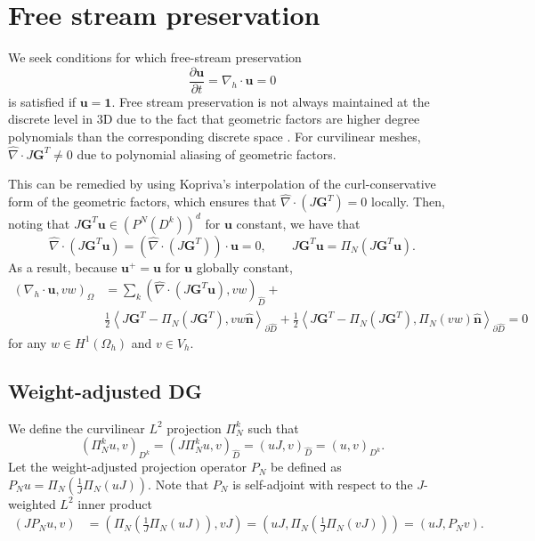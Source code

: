 \documentclass[preprint,10pt]{article}
\theoremstyle{definition}
\theoremstyle{lemma}
\theoremstyle{theorem}
\theoremstyle{assumption}
\renewcommand{\hat}{\widehat}
\newcommand{\pd}[2]{\frac{\partial#1}{\partial#2}}
\newcommand{\LRp}[1]{\left( #1 \right)}
\newcommand{\LRa}[1]{\left\langle #1 \right\rangle}
\newcommand{\Grad} {\ensuremath{\nabla}}
\renewcommand{\d}{\partial}
\begin{document}
\section{Free stream preservation}

We seek conditions for which free-stream preservation 
\[
\pd{\bm{u}}{t} = \Grad_h \cdot \bm{u} = 0
\]
is satisfied if $\bm{u} = \bm{1}$.  Free stream preservation is not always maintained at the discrete level in 3D due to the fact that geometric factors are higher degree polynomials than the corresponding discrete space \cite{kopriva2006metric, johnen2013geometrical}.  For curvilinear meshes, $\hat{\Grad}\cdot{J\bm{G}^T} \neq 0$ due to polynomial aliasing of geometric factors.  

This can be remedied by using Kopriva's interpolation of the curl-conservative form of the geometric factors, which ensures that $\hat{\Grad}\cdot\LRp{J\bm{G}^T} = 0$ locally.   Then, noting that $J\bm{G}^T\bm{u} \in \LRp{P^N\LRp{D^k}}^d$ for $\bm{u}$ constant, we have that
\[
\hat{\Grad}\cdot \LRp{J\bm{G}^T\bm{u}} = \LRp{\hat{\Grad}\cdot \LRp{J\bm{G}^T}}\cdot\bm{u} = 0, \qquad J\bm{G}^T\bm{u} = \Pi_N\LRp{J\bm{G}^T\bm{u}}.
\]
As a result, because $\bm{u}^+ = \bm{u}$ for $\bm{u}$ globally constant,
\begin{align*}
\LRp{\Grad_h \cdot \bm{u},vw}_{\Omega} &= \sum_k \LRp{\hat{\Grad} \cdot \LRp{J\bm{G}^T\bm{u}},vw }_{\hat{D}} + \\
&\frac{1}{2}\LRa{J\bm{G}^T - \Pi_N \LRp{J\bm{G}^T}, vw \hat{\bm{n}}}_{\d \hat{D}} + \frac{1}{2}\LRa{J\bm{G}^T - \Pi_N \LRp{J\bm{G}^T}, \Pi_N\LRp{vw}\hat{\bm{n}}}_{\d \hat{D}} = 0
\end{align*}
for any $w \in H^1\LRp{\Omega_h}$ and $v\in V_h$.  





\subsection{Weight-adjusted DG}


We define the curvilinear $L^2$ projection $\Pi_N^k$ such that
\[
\LRp{\Pi_N^k u,v}_{D^k} = \LRp{J \Pi_N^k u,v}_{\hat{D}} = \LRp{uJ,v}_{\hat{D}} = \LRp{u,v}_{D^k}.  
\]
Let the weight-adjusted projection operator $P_N$ be defined as $P_N u = \Pi_N\LRp{\frac{1}{J}\Pi_N\LRp{uJ}}$.  Note that $P_N$ is self-adjoint with respect to the $J$-weighted $L^2$ inner product
\begin{align*}
\LRp{J P_N u, v} &= \LRp{\Pi_N\LRp{\frac{1}{J}\Pi_N\LRp{uJ}}, vJ} = \LRp{uJ, \Pi_N\LRp{\frac{1}{J}\Pi_N\LRp{vJ}}} =  \LRp{uJ, P_N v}.
\end{align*}
\end{document}
